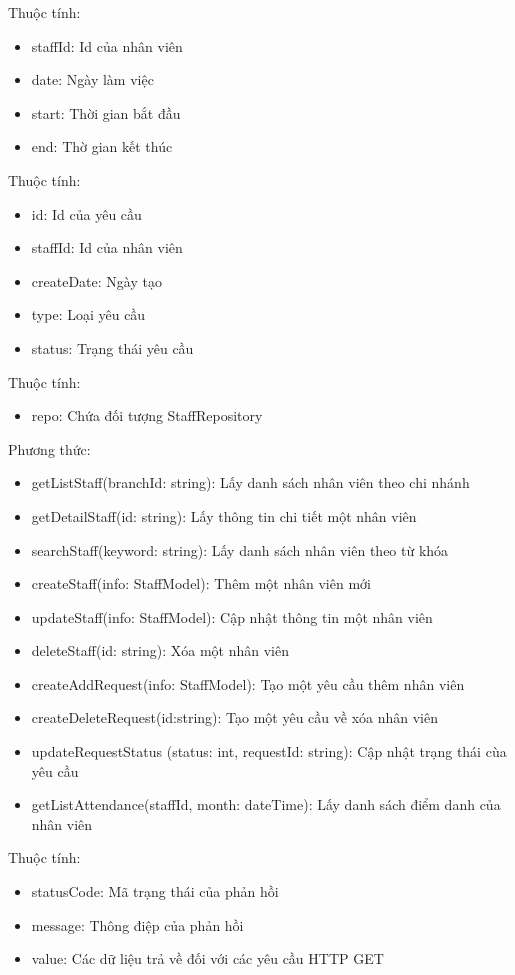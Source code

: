 Thuộc tính:
\begin{itemize}
	\item staffId: Id của nhân viên
	\item date: Ngày làm việc
	\item start: Thời gian bắt đầu
	\item end: Thờ gian kết thúc
\end{itemize}

Thuộc tính:
\begin{itemize}
	\item id: Id của yêu cầu
	\item staffId: Id của nhân viên
	\item createDate: Ngày tạo
	\item type: Loại yêu cầu
	\item status: Trạng thái yêu cầu
\end{itemize}

Thuộc tính:
\begin{itemize}
	\item repo: Chứa đối tượng StaffRepository
\end{itemize}
Phương thức:
\begin{itemize}
	\item getListStaff(branchId: string): Lấy danh sách nhân viên theo chi nhánh
	\item getDetailStaff(id: string): Lấy thông tin chi tiết một nhân viên
	\item searchStaff(keyword: string): Lấy danh sách nhân viên theo từ khóa
	\item createStaff(info: StaffModel): Thêm một nhân viên mới
	\item updateStaff(info: StaffModel): Cập nhật thông tin một nhân viên
	\item deleteStaff(id: string): Xóa một nhân viên
	\item createAddRequest(info: StaffModel): Tạo một yêu cầu thêm nhân viên
	\item createDeleteRequest(id:string): Tạo một yêu cầu về xóa nhân viên
	\item updateRequestStatus (status: int, requestId: string): Cập nhật trạng thái cùa yêu cầu
	\item getListAttendance(staffId, month: dateTime): Lấy danh sách điểm danh của nhân viên
\end{itemize}

Thuộc tính:
\begin{itemize}
	\item statusCode: Mã trạng thái của phản hồi
	\item message: Thông điệp của phản hồi
	\item value: Các dữ liệu trả về đối với các yêu cầu HTTP GET
\end{itemize}






